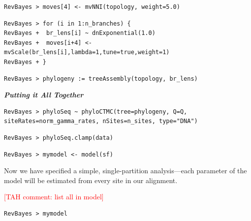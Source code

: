 \documentclass[11pt]{article}
\newcommand{\taha}[1]{{\textcolor{red}{[TAH comment: #1]}}} %
\begin{document}
{\tt \begin{snugshade*}
\begin{lstlisting}
RevBayes > moves[4] <- mvNNI(topology, weight=5.0)
\end{lstlisting}
\end{snugshade*}}

{\tt \small \begin{snugshade*}
\begin{lstlisting}
RevBayes > for (i in 1:n_branches) {
RevBayes +  br_lens[i] ~ dnExponential(1.0)
RevBayes +  moves[i+4] <- mvScale(br_lens[i],lambda=1,tune=true,weight=1) 
RevBayes + }
\end{lstlisting}
\end{snugshade*}}

{\tt \begin{snugshade*}
\begin{lstlisting}
RevBayes > phylogeny := treeAssembly(topology, br_lens)
\end{lstlisting}
\end{snugshade*}}




\textbf{\textit{Putting it All Together}}

{\tt \begin{snugshade*}
\begin{lstlisting}
RevBayes > phyloSeq ~ phyloCTMC(tree=phylogeny, Q=Q, siteRates=norm_gamma_rates, nSites=n_sites, type="DNA")
\end{lstlisting}
\end{snugshade*}}

{\tt \begin{snugshade*}
\begin{lstlisting}
RevBayes > phyloSeq.clamp(data)
\end{lstlisting}
\end{snugshade*}}

{\tt \begin{snugshade*}
\begin{lstlisting}
RevBayes > mymodel <- model(sf)
\end{lstlisting}
\end{snugshade*}}

Now we have specified a simple, single-partition analysis---each parameter of the model will be estimated from every site in our alignment.

\taha{list all in model}
{\tt \begin{snugshade*}
\begin{lstlisting}
RevBayes > mymodel
\end{lstlisting}
\end{snugshade*}}
\end{document}
